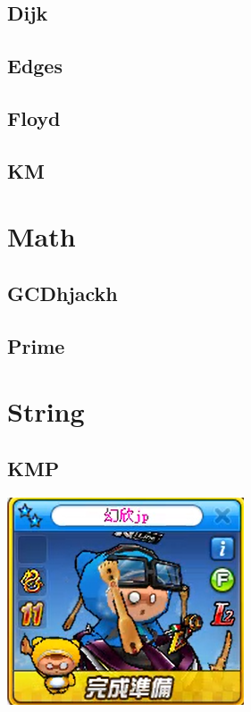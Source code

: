     \subsection{Dijk}
        
    \subsection{Edges}
            
    \subsection{Floyd}
        
    \subsection{KM}
        

\section{Math}
    \subsection{GCDhjackh}
        
    \subsection{Prime}
        
        
\section{String}
    \subsection{KMP}
        
\includegraphics{Contents/runrun.png}